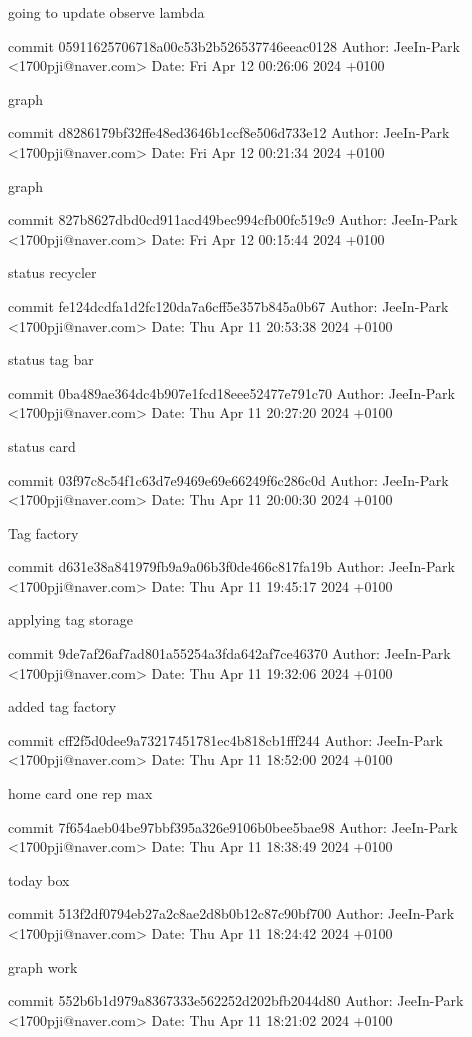     going to update observe lambda

commit 05911625706718a00c53b2b526537746eeac0128
Author: JeeIn-Park <1700pji@naver.com>
Date:   Fri Apr 12 00:26:06 2024 +0100

    graph

commit d8286179bf32ffe48ed3646b1ccf8e506d733e12
Author: JeeIn-Park <1700pji@naver.com>
Date:   Fri Apr 12 00:21:34 2024 +0100

    graph

commit 827b8627dbd0cd911acd49bec994cfb00fc519c9
Author: JeeIn-Park <1700pji@naver.com>
Date:   Fri Apr 12 00:15:44 2024 +0100

    status recycler

commit fe124dcdfa1d2fc120da7a6cff5e357b845a0b67
Author: JeeIn-Park <1700pji@naver.com>
Date:   Thu Apr 11 20:53:38 2024 +0100

    status tag bar

commit 0ba489ae364dc4b907e1fcd18eee52477e791c70
Author: JeeIn-Park <1700pji@naver.com>
Date:   Thu Apr 11 20:27:20 2024 +0100

    status card

commit 03f97c8c54f1c63d7e9469e69e66249f6c286c0d
Author: JeeIn-Park <1700pji@naver.com>
Date:   Thu Apr 11 20:00:30 2024 +0100

    Tag factory

commit d631e38a841979fb9a9a06b3f0de466c817fa19b
Author: JeeIn-Park <1700pji@naver.com>
Date:   Thu Apr 11 19:45:17 2024 +0100

    applying tag storage

commit 9de7af26af7ad801a55254a3fda642af7ce46370
Author: JeeIn-Park <1700pji@naver.com>
Date:   Thu Apr 11 19:32:06 2024 +0100

    added tag factory

commit cff2f5d0dee9a73217451781ec4b818cb1fff244
Author: JeeIn-Park <1700pji@naver.com>
Date:   Thu Apr 11 18:52:00 2024 +0100

    home card one rep max

commit 7f654aeb04be97bbf395a326e9106b0bee5bae98
Author: JeeIn-Park <1700pji@naver.com>
Date:   Thu Apr 11 18:38:49 2024 +0100

    today box

commit 513f2df0794eb27a2c8ae2d8b0b12c87c90bf700
Author: JeeIn-Park <1700pji@naver.com>
Date:   Thu Apr 11 18:24:42 2024 +0100

    graph work

commit 552b6b1d979a8367333e562252d202bfb2044d80
Author: JeeIn-Park <1700pji@naver.com>
Date:   Thu Apr 11 18:21:02 2024 +0100

